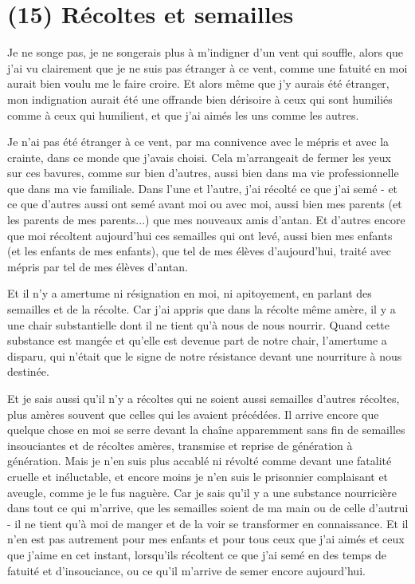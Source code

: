 \section{(15) Récoltes et semailles}

Je ne songe pas, je ne songerais plus à m'indigner d'un vent qui souffle, alors que j'ai vu clairement que je ne suis pas étranger à ce vent, comme une fatuité en moi aurait bien voulu me le faire croire. Et alors même que j'y aurais été étranger, mon indignation aurait été une offrande bien dérisoire à ceux qui sont humiliés comme à ceux qui humilient, et que j'ai aimés les uns comme les autres.

Je n'ai pas été étranger à ce vent, par ma connivence avec le mépris et avec la crainte, dans ce monde que j'avais choisi. Cela m'arrangeait de fermer les yeux sur ces bavures, comme sur bien d'autres, aussi bien dans ma vie professionnelle que dans ma vie familiale. Dans l'une et l'autre, j'ai récolté ce que j'ai semé - et ce que d'autres aussi ont semé avant moi ou avec moi, aussi bien mes parents (et les parents de mes parents...) que mes nouveaux amis d'antan. Et d'autres encore que moi récoltent aujourd'hui ces semailles qui ont levé, aussi bien mes enfants (et les enfants de mes enfants), que tel de mes élèves d'aujourd'hui, traité avec mépris par tel de mes élèves d'antan.

Et il n'y a amertume ni résignation en moi, ni apitoyement, en parlant des semailles et de la récolte. Car j'ai appris que dans la récolte même amère, il y a une chair substantielle dont il ne tient qu'à nous de nous nourrir. Quand cette substance est mangée et qu'elle est devenue part de notre chair, l'amertume a disparu, qui n'était que le signe de notre résistance devant une nourriture à nous destinée.

Et je sais aussi qu'il n'y a récoltes qui ne soient aussi semailles d'autres récoltes, plus amères souvent que celles qui les avaient précédées. Il arrive encore que quelque chose en moi se serre devant la chaîne apparemment sans fin de semailles insouciantes et de récoltes amères, transmise et reprise de génération à génération. Mais je n'en suis plus accablé ni révolté comme devant une fatalité cruelle et inéluctable, et encore moins je n'en suis le prisonnier complaisant et aveugle, comme je le fus naguère. Car je sais qu'il y a une substance nourricière dans tout ce qui m'arrive, que les semailles soient de ma main ou de celle d'autrui - il ne tient qu'à moi de manger et de la voir se transformer en connaissance. Et il n'en est pas autrement pour mes enfants et pour tous ceux que j'ai aimés et ceux que j'aime en cet instant, lorsqu'ils récoltent ce que j'ai semé en des temps de fatuité et d'insouciance, ou ce qu'il m'arrive de semer encore aujourd'hui.


